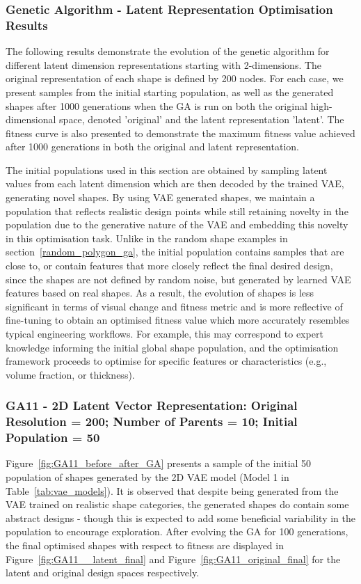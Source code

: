 \documentclass{article}
\begin{document}
\subsubsection{Genetic Algorithm - Latent Representation Optimisation Results}\label{GA-optimisation-latent}
The following results demonstrate the evolution of the genetic algorithm for different latent dimension representations starting with 2-dimensions. The original representation of each shape is defined by 200 nodes. For each case, we present samples from the initial starting population, as well as the generated shapes after 1000 generations when the GA is run on both the original high-dimensional space, denoted 'original' and the latent representation 'latent'. The fitness curve is also presented to demonstrate the maximum fitness value achieved after 1000 generations in both the original and latent representation.

The initial populations used in this section are obtained by sampling latent values from each latent dimension which are then decoded by the trained VAE, generating novel shapes. By using VAE generated shapes, we maintain a population that reflects realistic design points while still retaining novelty in the population due to the generative nature of the VAE and embedding this novelty in this optimisation task. Unlike in the random shape examples in section~\ref{random_polygon_ga}, the initial population contains samples that are close to, or contain features that more closely reflect the final desired design, since the shapes are not defined by random noise, but generated by learned VAE features based on real shapes. As a result, the evolution of shapes is less significant in terms of visual change and fitness metric and is more reflective of fine-tuning to obtain an optimised fitness value which more accurately resembles typical engineering workflows. For example, this may correspond to expert knowledge informing the initial global shape population, and the optimisation framework proceeds to optimise for specific features or characteristics (e.g., volume fraction, or thickness).

\subsubsection*{GA11 - 2D Latent Vector Representation: Original Resolution = 200; Number of Parents = 10; Initial Population = 50}

Figure~\ref{fig:GA11_before_after_GA} presents a sample of the initial 50 population of shapes generated by the 2D VAE model (Model 1 in Table~\ref{tab:vae_models}). It is observed that despite being generated from the VAE trained on realistic shape categories, the generated shapes do contain some abstract designs - though this is expected to add some beneficial variability in the population to encourage exploration. After evolving the GA for 100 generations, the final optimised shapes with respect to fitness are displayed in Figure~\ref{fig:GA11__latent_final} and Figure~\ref{fig:GA11_original_final} for the latent and original design spaces respectively.
\end{document}
